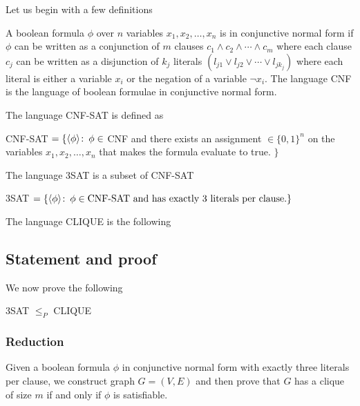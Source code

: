 Let us begin with a few definitions
\begin{definition}
	A boolean formula \(\phi\) over \(n\) variables \(x_1,x_2,\ldots,x_n\) is in
	conjunctive normal form if \(\phi\) can be
	written as a conjunction of \(m\) clauses \(c_1 \land c_2 \land \cdots \land
	c_m\) where each clause \(c_j\) can be written as a disjunction of
	\(k_j\) literals
	\((l_{j1} \lor l_{j2} \lor \cdots \lor l_{jk_j})\) where each literal is
	either a variable \(x_i\) or the negation of a variable \(\lnot x_i\).
	The language CNF is the language of boolean formulae in conjunctive normal
	form.
\end{definition}

The language CNF-SAT is defined as
\begin{definition}
	CNF-SAT \(= \{ \langle \phi \rangle \colon\, \phi \in\) CNF and there exists an
	assignment \(\in \{0,1\}^n\) on the variables \(x_1,x_2,\ldots,x_n\) that
	makes the formula evaluate to true. \(\}\)
\end{definition}

The language 3SAT is a subset of CNF-SAT
\begin{definition}
	3SAT \(= \{ \langle \phi \rangle \colon\, \phi \in \text{CNF-SAT and has
	exactly 3 literals per clause.}\}\)
\end{definition}

The language CLIQUE is the following

\subsection{Statement and proof}

We now prove the following
\begin{theorem}
	3SAT \(\le_P\) CLIQUE
\end{theorem}

\subsubsection{Reduction}

Given a boolean formula \(\phi\) in conjunctive normal form with exactly three
literals per clause, we construct graph \(G = (V,E)\) and then prove that \(G\)
has a clique of size \(m\) if and only if \(\phi\) is satisfiable.

